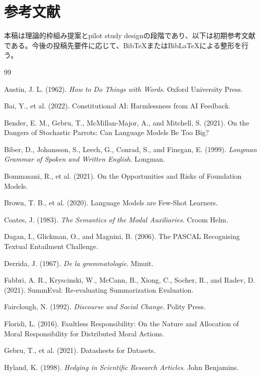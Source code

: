\documentclass[
  a4paper]{ltjsarticle}
\begin{document}
\section*{参考文献}\label{references}

本稿は理論的枠組み提案とpilot study designの段階であり、以下は初期参考文献である。今後の投稿先要件に応じて、BibTeXまたはBibLaTeXによる整形を行う。

\begin{thebibliography}{99}

Austin, J. L. (1962). \textit{How to Do Things with Words}. Oxford University Press.

Bai, Y., et al. (2022). Constitutional AI: Harmlessness from AI Feedback.

Bender, E. M., Gebru, T., McMillan-Major, A., and Mitchell, S. (2021). On the Dangers of Stochastic Parrots: Can Language Models Be Too Big?

Biber, D., Johansson, S., Leech, G., Conrad, S., and Finegan, E. (1999). \textit{Longman Grammar of Spoken and Written English}. Longman.

Bommasani, R., et al. (2021). On the Opportunities and Risks of Foundation Models.

Brown, T. B., et al. (2020). Language Models are Few-Shot Learners.

Coates, J. (1983). \textit{The Semantics of the Modal Auxiliaries}. Croom Helm.

Dagan, I., Glickman, O., and Magnini, B. (2006). The PASCAL Recognising Textual Entailment Challenge.

Derrida, J. (1967). \textit{De la grammatologie}. Minuit.

Fabbri, A. R., Kryscinski, W., McCann, B., Xiong, C., Socher, R., and Radev, D. (2021). SummEval: Re-evaluating Summarization Evaluation.

Fairclough, N. (1992). \textit{Discourse and Social Change}. Polity Press.

Floridi, L. (2016). Faultless Responsibility: On the Nature and Allocation of Moral Responsibility for Distributed Moral Actions.

Gebru, T., et al. (2021). Datasheets for Datasets.

Hyland, K. (1998). \textit{Hedging in Scientific Research Articles}. John Benjamins.


\end{thebibliography}
\end{document}

